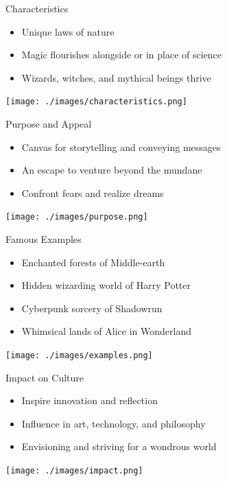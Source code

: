 \documentclass{beamer}
\begin{document}
\begin{frame}{Characteristics}
    \begin{itemize}
        \item Unique laws of nature
        \item Magic flourishes alongside or in place of science
        \item Wizards, witches, and mythical beings thrive
    \end{itemize}
    \begin{center}
        \texttt{[image: ./images/characteristics.png]}
    \end{center}
\end{frame}

\begin{frame}{Purpose and Appeal}
    \begin{itemize}
        \item Canvas for storytelling and conveying messages
        \item An escape to venture beyond the mundane
        \item Confront fears and realize dreams
    \end{itemize}
    \begin{center}
        \texttt{[image: ./images/purpose.png]}
    \end{center}
\end{frame}

\begin{frame}{Famous Examples}
    \begin{itemize}
        \item Enchanted forests of Middle-earth
        \item Hidden wizarding world of Harry Potter
        \item Cyberpunk sorcery of Shadowrun
        \item Whimsical lands of Alice in Wonderland
    \end{itemize}
    \begin{center}
        \texttt{[image: ./images/examples.png]}
    \end{center}
\end{frame}

\begin{frame}{Impact on Culture}
    \begin{itemize}
        \item Inspire innovation and reflection
        \item Influence in art, technology, and philosophy
        \item Envisioning and striving for a wondrous world
    \end{itemize}
    \begin{center}
        \texttt{[image: ./images/impact.png]}
    \end{center}
\end{frame}
\end{document}

